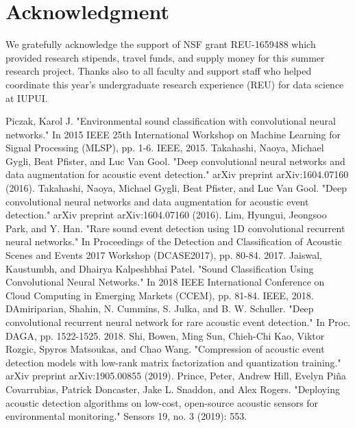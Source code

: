 \documentclass[conference]{IEEEtran}
\begin{document}
\section*{Acknowledgment}

We gratefully acknowledge the support of NSF grant REU-1659488 which provided research stipends, travel funds, and supply money for this summer research project. Thanks also to all faculty and support staff who helped coordinate this year's undergraduate research experience (REU) for data science at IUPUI.

\begin{thebibliography}{00}
 Piczak, Karol J. "Environmental sound classification with convolutional neural networks." In 2015 IEEE 25th International Workshop on Machine Learning for Signal Processing (MLSP), pp. 1-6. IEEE, 2015.
 Takahashi, Naoya, Michael Gygli, Beat Pfister, and Luc Van Gool. "Deep convolutional neural networks and data augmentation for acoustic event detection." arXiv preprint arXiv:1604.07160 (2016).
 Takahashi, Naoya, Michael Gygli, Beat Pfister, and Luc Van Gool. "Deep convolutional neural networks and data augmentation for acoustic event detection." arXiv preprint arXiv:1604.07160 (2016).
 Lim, Hyungui, Jeongsoo Park, and Y. Han. "Rare sound event detection using 1D convolutional recurrent neural networks." In Proceedings of the Detection and Classification of Acoustic Scenes and Events 2017 Workshop (DCASE2017), pp. 80-84. 2017.
 Jaiswal, Kaustumbh, and Dhairya Kalpeshbhai Patel. "Sound Classification Using Convolutional Neural Networks." In 2018 IEEE International Conference on Cloud Computing in Emerging Markets (CCEM), pp. 81-84. IEEE, 2018.
 DAmiriparian, Shahin, N. Cummins, S. Julka, and B. W. Schuller. "Deep convolutional recurrent neural network for rare acoustic event detection." In Proc. DAGA, pp. 1522-1525. 2018.
 Shi, Bowen, Ming Sun, Chieh-Chi Kao, Viktor Rozgic, Spyros Matsoukas, and Chao Wang. "Compression of acoustic event detection models with low-rank matrix factorization and quantization training." arXiv preprint arXiv:1905.00855 (2019).
 Prince, Peter, Andrew Hill, Evelyn Piña Covarrubias, Patrick Doncaster, Jake L. Snaddon, and Alex Rogers. "Deploying acoustic detection algorithms on low-cost, open-source acoustic sensors for environmental monitoring." Sensors 19, no. 3 (2019): 553.
\end{thebibliography}
\end{document}
